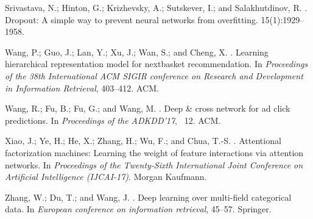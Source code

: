 \documentclass[letterpaper]{article} \usepackage{aaai19}  \usepackage{times}  \usepackage{helvet}  \usepackage{courier}  \usepackage{url}  \usepackage{graphicx}  \frenchspacing  \setlength{\pdfpagewidth}{8.5in}  \setlength{\pdfpageheight}{11in}  \usepackage{mathtools}
\begin{document}
\begin{thebibliography}{}
Srivastava, N.; Hinton, G.; Krizhevsky, A.; Sutskever, I.; and Salakhutdinov,
  R.
.
\newblock Dropout: A simple way to prevent neural networks from overfitting.
 15(1):1929--1958.

Wang, P.; Guo, J.; Lan, Y.; Xu, J.; Wan, S.; and Cheng, X.
.
\newblock Learning hierarchical representation model for nextbasket
  recommendation.
\newblock In {\em Proceedings of the 38th International ACM SIGIR conference on
  Research and Development in Information Retrieval},  403--412.
\newblock ACM.

Wang, R.; Fu, B.; Fu, G.; and Wang, M.
.
\newblock Deep \& cross network for ad click predictions.
\newblock In {\em Proceedings of the ADKDD'17}, ~12.
\newblock ACM.

Xiao, J.; Ye, H.; He, X.; Zhang, H.; Wu, F.; and Chua, T.-S.
.
\newblock Attentional factorization machines: Learning the weight of feature
  interactions via attention networks.
\newblock In {\em Proceedings of the Twenty-Sixth International Joint
  Conference on Artificial Intelligence (IJCAI-17)}.
\newblock Morgan Kaufmann.

Zhang, W.; Du, T.; and Wang, J.
.
\newblock Deep learning over multi-field categorical data.
\newblock In {\em European conference on information retrieval},  45--57.
\newblock Springer.

\end{thebibliography}


\end{document}
